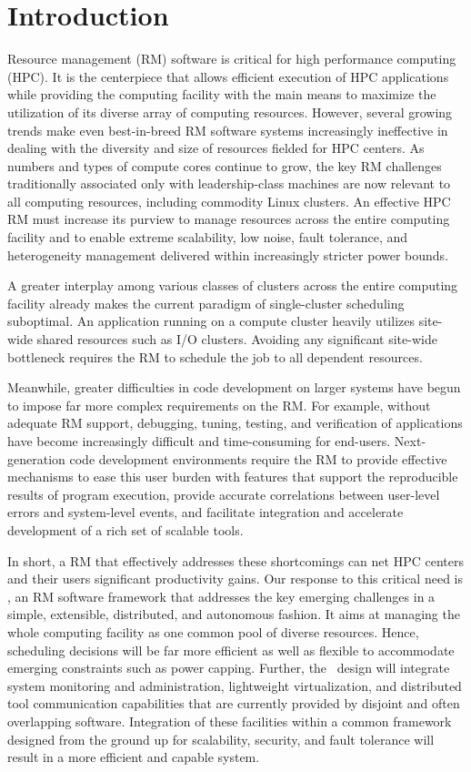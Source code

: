 \section{Introduction}

Resource management (RM) software is critical
for high performance computing (HPC).
It is the centerpiece that allows efficient
execution of HPC applications while providing
the computing facility with the main means
to maximize the utilization of its diverse array of computing
resources.
However, several growing trends make even
best-in-breed RM software systems increasingly ineffective
in dealing with the diversity and size of resources fielded for HPC centers.
As numbers and types of compute cores
continue to grow, the key RM challenges traditionally associated only
with leadership-class machines are now
relevant to all computing resources, including
commodity Linux clusters. An effective HPC RM must increase
its purview to manage resources across the entire
computing facility and to enable extreme scalability,
low noise, fault tolerance,
and heterogeneity management delivered within increasingly
stricter power bounds.

A greater interplay among various classes
of clusters across the entire computing facility already 
makes the current paradigm of single-cluster scheduling
suboptimal. An application running on a compute
cluster heavily utilizes site-wide shared resources
such as I/O clusters. 
Avoiding any significant site-wide bottleneck
requires the RM to schedule the job to all dependent
resources.

Meanwhile, greater difficulties in code development
on larger systems have begun to impose far more complex
requirements on the RM. For example, without adequate
RM support, debugging, tuning, testing, and verification
of applications have become increasingly difficult
and time-consuming for end-users.
Next-generation code development environments
require the RM to provide effective mechanisms
to ease this user burden with features that support the reproducible results of program execution,
provide accurate correlations between user-level errors
and system-level events,
and facilitate integration and accelerate development of a rich set of scalable tools.

In short, a RM that effectively
addresses these shortcomings can net HPC centers
and their users significant productivity gains.
Our response to this critical need is \flux,
an RM software framework that addresses the key emerging
challenges in a simple, extensible, distributed,
and autonomous fashion.
It aims at managing the whole computing facility
as one common pool of diverse resources.
Hence, scheduling decisions will be far more efficient
as well as flexible to accommodate emerging constraints
such as power capping.
Further, the \flux\ design will integrate system monitoring and
administration, lightweight virtualization, 
and distributed tool communication capabilities 
that are currently provided by disjoint
and often overlapping software. 
Integration of these facilities within a common framework
designed from the ground up for scalability, security,
and fault tolerance will result in a more efficient
and capable system.

